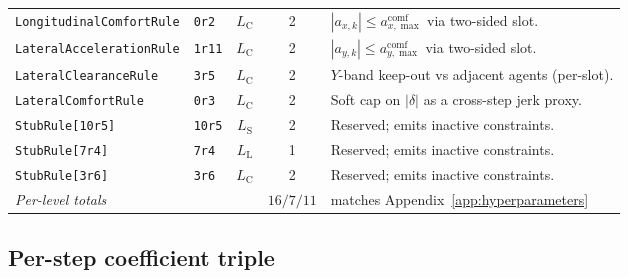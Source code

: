 \begin{table}[h]
\begin{tabularx}{\linewidth}{@{}l l c c X@{}}
        \texttt{LongitudinalComfortRule}  & \texttt{0r2}                & $L_{\mathrm{C}}$ & 2 & $|a_{x, k}| \leq a_{x, \max}^{\mathrm{comf}}$ via two-sided slot. \\
        \texttt{LateralAccelerationRule}  & \texttt{1r11}               & $L_{\mathrm{C}}$ & 2 & $|a_{y, k}| \leq a_{y, \max}^{\mathrm{comf}}$ via two-sided slot. \\
        \texttt{LateralClearanceRule}     & \texttt{3r5}                & $L_{\mathrm{C}}$ & 2 & $Y$-band keep-out vs adjacent agents (per-slot). \\
        \texttt{LateralComfortRule}       & \texttt{0r3}                & $L_{\mathrm{C}}$ & 2 & Soft cap on $|\delta|$ as a cross-step jerk proxy. \\
        \midrule
        \texttt{StubRule[\texttt{10r5}]} & \texttt{10r5} & $L_{\mathrm{S}}$ & 2 & Reserved; emits inactive constraints. \\
        \texttt{StubRule[\texttt{7r4}]}  & \texttt{7r4}  & $L_{\mathrm{L}}$ & 1 & Reserved; emits inactive constraints. \\
        \texttt{StubRule[\texttt{3r6}]}  & \texttt{3r6}  & $L_{\mathrm{C}}$ & 2 & Reserved; emits inactive constraints. \\
        \midrule
        \multicolumn{3}{l}{\emph{Per-level totals}} & $16/7/11$ & matches Appendix~\ref{app:hyperparameters} \\
        \bottomrule
    \end{tabularx}
\end{table}

\subsection*{Per-step coefficient triple}

